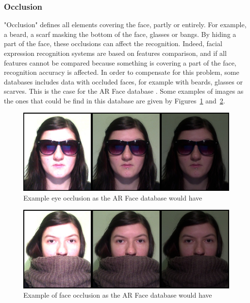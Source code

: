 \subsubsection{Occlusion}

\vspace{\baselineskip}
\noindent "Occlusion" defines all elements covering the face, partly or entirely. For example, a beard, a scarf masking the bottom of the face, glasses or bangs. By hiding a part of the face, these occlusions can affect the recognition. Indeed, facial expression recognition systems are based on features comparison, and if all  features cannot be compared because something is covering a part of the face, recognition accuracy is affected. In order to compensate for this problem, some databases includes data with occluded faces, for example with beards, glasses or scarves. This is the case for the AR Face database \cite{ARFACE}. Some examples of images as the ones that could be find in this database are given by Figures~\ref{arface_example2} and~\ref{arface_example3}.
\newline

\begin{figure}[!h]
\begin{center}
\noindent \includegraphics[scale=0.5]{figures/arface_example2} 
\newline
\caption{Example eye occlusion as the AR Face database would have}
\label{arface_example2}
\end{center} 
\end{figure}

\begin{figure}[!h]
\begin{center}
\noindent \includegraphics[scale=0.5]{figures/arface_example3} 
\newline
\caption{Example of face occlusion as the AR Face database would have}
\label{arface_example3}
\end{center} 
\end{figure} 

